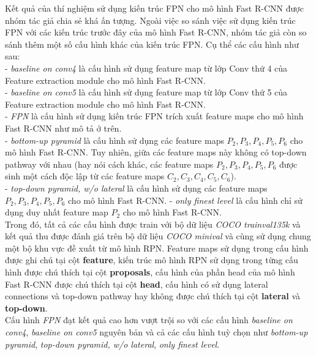 {    Kết quả của thí nghiệm sử dụng kiến trúc FPN cho mô hình Fast R-CNN được nhóm tác giả chia sẻ khá ấn tượng.
    Ngoài việc so sánh việc sử dụng kiến trúc FPN với các kiến trúc trước đây của mô hình Fast R-CNN, nhóm tác giả còn so sánh thêm một số cấu hình khác của kiến trúc FPN.
    Cụ thể các cấu hình như sau: \\
    - \textit{baseline on conv4} là cấu hình sử dụng feature map từ lớp Conv thứ 4 của Feature extraction module cho mô hình Fast R-CNN. \\
    - \textit{baseline on conv5} là cấu hình sử dụng feature map từ lớp Conv thứ 5 của Feature extraction module cho mô hình Fast R-CNN. \\
    - \textit{FPN} là cấu hình sử dụng kiến trúc FPN trích xuất feature maps cho mô hình Fast R-CNN như mô tả ở trên. \\
    - \textit{bottom-up pyramid} là cấu hình sử dụng các feature maps \textit{{${P}_{2}, {P}_{3}, {P}_{4}, {P}_{5}, {P}_{6}$}} cho mô hình Fast R-CNN.
    Tuy nhiên, giữa các feature maps này không có top-down pathway với nhau (hay nói cách khác, các feature maps \textit{{${P}_{2}, {P}_{3}, {P}_{4}, {P}_{5}, {P}_{6}$}} được sinh một cách độc lập từ các feature maps \textit{{${C}_{2}, {C}_{3}, {C}_{4}, {C}_{5}, {C}_{6}$}}). \\
    - \textit{top-down pyramid, w/o lateral} là cấu hình sử dụng các feature maps \textit{{${P}_{2}, {P}_{3}, {P}_{4}, {P}_{5}, {P}_{6}$}} cho mô hình Fast R-CNN.
    - \textit{only finest level} là cấu hình chỉ sử dụng duy nhất feature map \textit{${P}_{2}$} cho mô hình Fast R-CNN. \\
    Trong đó, tất cả các cấu hình được train với bộ dữ liệu \textit{COCO trainval135k} và kết quả thu được đánh giá trên bộ dữ liệu \textit{COCO minival} và cùng sử dụng chung một bộ khu vực đề xuất từ mô hình RPN.
    Feature maps sử dụng trong cấu hình được ghi chú tại cột \textbf{feature}, kiến trúc mô hình RPN sử dụng trong từng cấu hình được chú thích tại cột \textbf{proposals}, cấu hình của phần head của mô hình Fast R-CNN được chú thích tại cột \textbf{head}, cấu hình có sử dụng lateral connections và top-down pathway hay không được chú thích tại cột \textbf{lateral} và \textbf{top-down}. \\
    Cấu hình \textit{FPN} đạt kết quả cao hơn vượt trội so với các cấu hình \textit{baseline on conv4}, \textit{baseline on conv5} nguyên bản và cả các cấu hình tuỳ chọn như \textit{bottom-up pyramid}, \textit{top-down pyramid, w/o lateral}, \textit{only finest level}.

}

